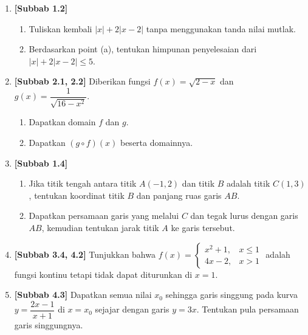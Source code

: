 \documentclass[10pt,openany,a4paper]{article}
\theoremstyle{definition}
\theoremstyle{definition}
\theoremstyle{plain}
\begin{document}
\begin{enumerate}
    \item \textbf{[Subbab 1.2]} \begin{enumerate}
        \item Tuliskan kembali $|x|+2|x-2|$ tanpa menggunakan tanda nilai mutlak.
        \item Berdasarkan point (a), tentukan himpunan penyelesaian dari $|x|+2|x-2|\leq 5$.
    \end{enumerate}

    \item \textbf{[Subbab 2.1, 2.2]} Diberikan fungsi $f(x)=\sqrt{2-x}$ dan $g(x)=\dfrac{1}{\sqrt{16-x^2}}$.
    \begin{enumerate}
        \item Dapatkan domain $f$ dan $g$.
        \item Dapatkan $(g\circ f)(x)$ beserta domainnya.
    \end{enumerate}

    \item \textbf{[Subbab 1.4]} \begin{enumerate}
        \item Jika titik tengah antara titik $A(-1,2)$ dan titik $B$ adalah titik $C(1,3)$, tentukan koordinat titik $B$ dan panjang ruas garis $AB$.
        \item Dapatkan persamaan garis yang melalui $C$ dan tegak lurus dengan garis $AB$, kemudian tentukan jarak titik $A$ ke garis tersebut.
    \end{enumerate}

    \item \textbf{[Subbab 3.4, 4.2]} Tunjukkan bahwa $f(x)=\begin{cases}
        x^2+1, & x\leq 1\\
        4x-2, & x>1
    \end{cases}$ adalah fungsi kontinu tetapi tidak dapat diturunkan di $x=1$.

    \item \textbf{[Subbab 4.3]} Dapatkan semua nilai $x_0$ sehingga garis singgung pada kurva $y=\dfrac{2x-1}{x+1}$ di $x=x_0$ sejajar dengan garis $y=3x$. Tentukan pula persamaan garis singgungnya.
\end{enumerate}
\end{document}
